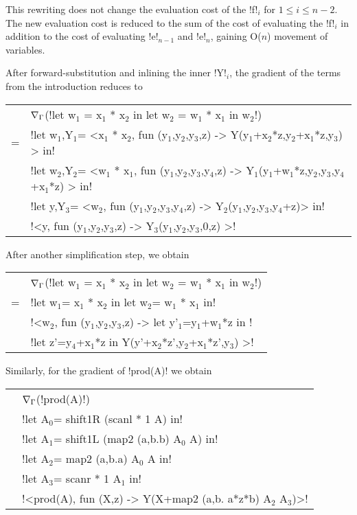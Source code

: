 This rewriting does not change the evaluation cost of the !f!$_{i}$ for $1\leq i \leq n-2$.
The new evaluation cost is reduced to the sum of the cost of evaluating 
the !f!$_{i}$ in addition to the cost of evaluating !e!$_{n-1}$ and !e!$_{n}$, gaining O($n$) movement of variables.

\begin{example}
    After forward-substitution and inlining the inner !Y!$_{i}$, the gradient of the terms from the introduction reduces to

    \begin{tabular}{c l}
        & $\nabla_\Gamma$(!let w$_{1}$ = x$_{1}$ * x$_{2}$ in let w$_{2}$ = w$_{1}$ * x$_{1}$ in w$_{2}$!) \\
        =& !let w$_1$,Y$_1$= <x$_1$ * x$_{2}$, fun (y$_{1}$,y$_{2}$,y$_{3}$,z) -> Y(y$_{1}$+x$_2$*z,y$_{2}$+x$_1$*z,y$_{3}$) > in! \\
        & !let w$_{2}$,Y$_{2}$= <w$_{1}$ * x$_{1}$, fun (y$_{1}$,y$_{2}$,y$_{3}$,y$_{4}$,z) -> Y$_{1}$(y$_{1}$+w$_1$*z,y$_{2}$,y$_{3}$,y$_{4}$+x$_{1}$*z) > in! \\
        & !let y,Y$_{3}$= <w$_{2}$, fun (y$_{1}$,y$_{2}$,y$_{3}$,y$_{4}$,z) -> Y$_{2}$(y$_{1}$,y$_{2}$,y$_{3}$,y$_{4}$+z)> in! \\
        & !<y, fun (y$_{1}$,y$_{2}$,y$_{3}$,z) -> Y$_{3}$(y$_{1}$,y$_{2}$,y$_{3}$,0,z) >!
    \end{tabular}

After another simplification step, we obtain 

\begin{tabular}{c l}
    & $\nabla_\Gamma$(!let w$_{1}$ = x$_{1}$ * x$_{2}$ in let w$_{2}$ = w$_{1}$ * x$_{1}$ in w$_{2}$!) \\
    =& !let w$_1$= x$_1$ * x$_{2}$ in let w$_{2}$= w$_{1}$ * x$_{1}$ in! \\
        & !<w$_{2}$, fun (y$_{1}$,y$_{2}$,y$_{3}$,z) -> let y'$_{1}$=y$_{1}$+w$_1$*z in !\\
        & \quad\quad\quad!let z'=y$_4$+x$_1$*z in Y(y'+x$_2$*z',y$_{2}$+x$_1$*z',y$_{3}$) >!
\end{tabular}

Similarly, for the gradient of !prod(A)! we obtain

\begin{tabular}{c l}
        & $\nabla_\Gamma$(!prod(A)!) \\
        & !let A$_{0}$= shift1R (scanl * 1 A) in!\\
        & !let A$_{1}$= shift1L (map2 (a,b.b) A$_{0}$ A) in!\\
        & !let A$_{2}$= map2 (a,b.a) A$_{0}$ A in!\\
        & !let A$_{3}$= scanr * 1 A$_{1}$ in!\\
        & !<prod(A), fun (X,z) -> Y(X+map2 (a,b. a*z*b) A$_{2}$ A$_{3}$)>! 
    \end{tabular}
\end{example}

